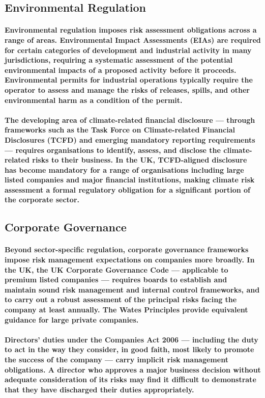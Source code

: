 \subsection{Environmental Regulation}
\paragraph{Environmental regulation imposes risk assessment obligations across a range of areas. \textbf{Environmental Impact Assessments (EIAs)} are required for certain categories of development and industrial activity in many jurisdictions, requiring a systematic assessment of the potential environmental impacts of a proposed activity before it proceeds. \textbf{Environmental permits} for industrial operations typically require the operator to assess and manage the risks of releases, spills, and other environmental harm as a condition of the permit.}
\paragraph{The developing area of \textbf{climate-related financial disclosure} — through frameworks such as the \textbf{Task Force on Climate-related Financial Disclosures (TCFD)} and emerging mandatory reporting requirements — requires organisations to identify, assess, and disclose the climate-related risks to their business. In the UK, TCFD-aligned disclosure has become mandatory for a range of organisations including large listed companies and major financial institutions, making climate risk assessment a formal regulatory obligation for a significant portion of the corporate sector.}

\subsection{Corporate Governance}
\paragraph{Beyond sector-specific regulation, \textbf{corporate governance} frameworks impose risk management expectations on companies more broadly. In the UK, the \textbf{UK Corporate Governance Code} — applicable to premium listed companies — requires boards to establish and maintain sound risk management and internal control frameworks, and to carry out a robust assessment of the principal risks facing the company at least annually. The \textbf{Wates Principles} provide equivalent guidance for large private companies.}
\paragraph{Directors' duties under the \textbf{Companies Act 2006} — including the duty to act in the way they consider, in good faith, most likely to promote the success of the company — carry implicit risk management obligations. A director who approves a major business decision without adequate consideration of its risks may find it difficult to demonstrate that they have discharged their duties appropriately.}

